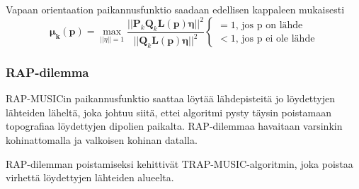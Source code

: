 Vapaan orientaation paikannusfunktio saadaan edellisen kappaleen mukaisesti
\begin{equation}
    \mathbf{\mu_k(p)} = \max_{||\eta||=1} \frac{||\mathbf{P}_k\mathbf{Q}_k\mathbf{L(p)\eta}||^2}{||\mathbf{Q}_k\mathbf{L(p)\eta}||^2}
    \begin{cases}
    =1\text{, jos p on lähde}\\
    <1\text{, jos p ei ole lähde}
     \end{cases}
\end{equation}


\subsubsection{RAP-dilemma}
RAP-MUSICin paikannusfunktio saattaa löytää lähdepisteitä jo löydettyjen lähteiden läheltä, joka johtuu siitä, ettei algoritmi pysty täysin poistamaan topografiaa löydettyjen dipolien paikalta. RAP-dilemmaa havaitaan varsinkin kohinattomalla ja valkoisen kohinan datalla. \citep{Makela2018TruncatedLocalization} 

RAP-dilemman poistamiseksi \cite{Makela2018TruncatedLocalization} kehittivät TRAP-MUSIC-algoritmin, joka poistaa virhettä löydettyjen lähteiden alueelta.